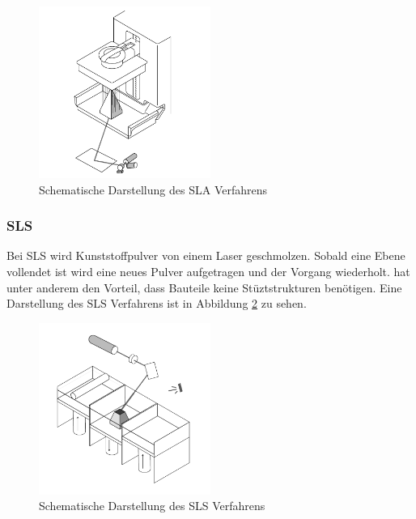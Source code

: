 \begin{figure}[H]
    \centering
    \includegraphics[width=0.5\textwidth]{images/sla.png}
    \caption{Schematische Darstellung des \ac{SLA} Verfahrens }
    \label{fig:sla}
\end{figure}

\subsubsection{\ac{SLS}}

Bei \ac{SLS} wird Kunststoffpulver von einem Laser geschmolzen. Sobald eine Ebene vollendet ist wird eine neues Pulver aufgetragen und der Vorgang wiederholt.  hat unter anderem den Vorteil, dass Bauteile keine Stüztstrukturen benötigen. Eine Darstellung des \ac{SLS} Verfahrens ist in Abbildung \ref{fig:sls} zu sehen.

\begin{figure}[H]
    \centering
    \includegraphics[width=0.5\textwidth]{images/sls.png}
    \caption{Schematische Darstellung des \ac{SLS} Verfahrens }
    \label{fig:sls}
\end{figure}
